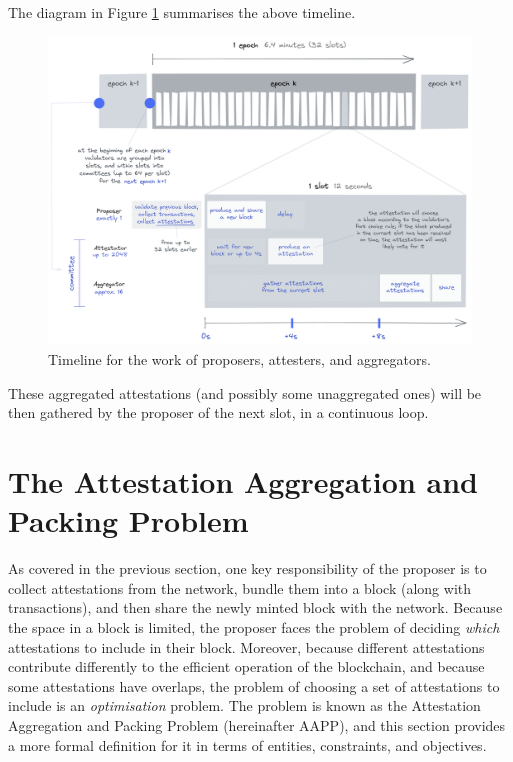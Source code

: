 \documentclass{article}
\begin{document}
The diagram in Figure \ref{fig:timeline} summarises the above timeline.
%
\begin{figure}[!ht]
  \hspace*{-0.1\textwidth}
  \centering
  \includegraphics[width=1.2\textwidth]{timeline.png}
  \caption{Timeline for the work of proposers, attesters, and 
  aggregators.\label{fig:timeline}}
\end{figure}
%
These aggregated attestations (and possibly some unaggregated ones) will be
then gathered by the proposer of the next slot, in a continuous loop.

\section{The Attestation Aggregation and Packing Problem}

As covered in the previous section, one key responsibility of the proposer is
to collect attestations from the network, bundle them into a block (along with
transactions), and then share the newly minted block with the network.  Because
the space in a block is limited, the proposer faces the problem of deciding
\emph{which} attestations to include in their block. Moreover, because
different attestations contribute differently to the efficient operation of the
blockchain, and because some attestations have overlaps, the problem of
choosing a set of attestations to include is an \emph{optimisation} problem.
The problem is known as the Attestation Aggregation and Packing Problem
(hereinafter AAPP), and this section provides a more formal definition for it
in terms of entities, constraints, and objectives.
\end{document}
